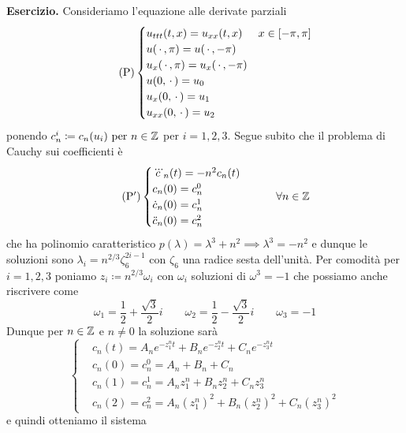 %
%


\textbf{Esercizio.}
Consideriamo l'equazione alle derivate parziali
\begin{equation}
	\tag{P}
	\begin{cases}
		u_{ttt}(t, x) = u_{xx}(t, x) & x \in [-\pi, \pi] \\
		u(\,\cdot\,, \pi) = u(\,\cdot\,, -\pi) \\
		u_x(\,\cdot\,, \pi) = u_x(\,\cdot\,, -\pi) \\
		u(0, \,\cdot\,) = u_0 \\
		u_{x}(0, \,\cdot\,) = u_1 \\
		u_{xx}(0, \,\cdot\,) = u_2 \\
	\end{cases}
\end{equation}
ponendo $c_n^i \coloneqq c_n(u_i) \text{ per } n \in \mathbb Z$ per $i = 1, 2, 3$. Segue subito che il problema di Cauchy sui coefficienti è
\begin{equation}
	\tag{P$'$}
	\begin{cases}
		\dddot c_n(t) = -n^2c_n(t) \\
		c_n(0) = c_n^0 \\
		\dot c_n(0) = c_n^1 \\
		\ddot c_n(0) = c_n^2 \\
	\end{cases}
	\qquad
	\forall n \in \mathbb Z
\end{equation}
che ha polinomio caratteristico $p(\lambda) = \lambda^3 + n^2 \implies \lambda^3 = -n^2$ e dunque le soluzioni sono $\lambda_i = n^{2/3} \zeta_6^{2i - 1}$ con $\zeta_6$ una radice sesta dell'unità. Per comodità per $i = 1, 2, 3$ poniamo $z_i \coloneqq n^{2/3} \omega_i$ con $\omega_i$ soluzioni di $\omega^3 = -1$ che possiamo anche riscrivere come
$$
\omega_1 = \frac{1}{2} + \frac{\sqrt 3}{2}i
\qquad
\omega_2 = \frac{1}{2} - \frac{\sqrt 3}{2}i
\qquad
\omega_3 = -1
$$
Dunque per $n \in \mathbb Z$ e $n \neq 0$ la soluzione sarà
$$
\left\{
\begin{aligned}
	& c_n(t) = A_n e^{-z_1^n t} + B_n e^{-z_2^n t} + C_n e^{-z_3^n t} \\[1ex]
	& c_n(0) = c_n^0 = A_n + B_n + C_n \\[1ex]
	& c_n(1) = c_n^1 = A_n z_1^n + B_n z_2^n + C_n z_3^n \\[1ex]
	& c_n(2) = c_n^2 = A_n (z_1^n)^2 + B_n (z_2^n)^2 + C_n (z_3^n)^2
\end{aligned}
\right.
$$
e quindi otteniamo il sistema
